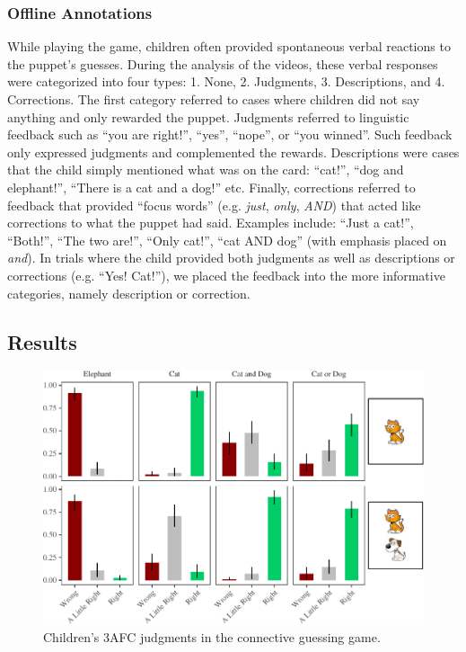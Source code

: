 \documentclass[floatsintext,man]{apa6}
\theoremstyle{definition}
\theoremstyle{definition}
\theoremstyle{definition}
\theoremstyle{remark}
\begin{document}
\subsubsection{Offline Annotations}\label{feedbackCoding}

While playing the game, children often provided spontaneous verbal
reactions to the puppet's guesses. During the analysis of the videos,
these verbal responses were categorized into four types: 1. None, 2.
Judgments, 3. Descriptions, and 4. Corrections. The first category
referred to cases where children did not say anything and only rewarded
the puppet. Judgments referred to linguistic feedback such as
\enquote{you are right!}, \enquote{yes}, \enquote{nope}, or \enquote{you
winned}. Such feedback only expressed judgments and complemented the
rewards. Descriptions were cases that the child simply mentioned what
was on the card: \enquote{cat!}, \enquote{dog and elephant!},
\enquote{There is a cat and a dog!} etc. Finally, corrections referred
to feedback that provided \enquote{focus words} (e.g. \emph{just},
\emph{only}, \emph{AND}) that acted like corrections to what the puppet
had said. Examples include: \enquote{Just a cat!}, \enquote{Both!},
\enquote{The two are!}, \enquote{Only cat!}, \enquote{cat AND dog} (with
emphasis placed on \emph{and}). In trials where the child provided both
judgments as well as descriptions or corrections (e.g. \enquote{Yes!
Cat!}), we placed the feedback into the more informative categories,
namely description or correction.

\subsection{Results}\label{results-1}

\begin{figure}
\centering
\includegraphics{figs/childrenTernaryPlot-1.pdf}
\caption{\label{fig:childrenTernaryPlot}Children's 3AFC judgments in the
connective guessing game.}
\end{figure}
\end{document}
